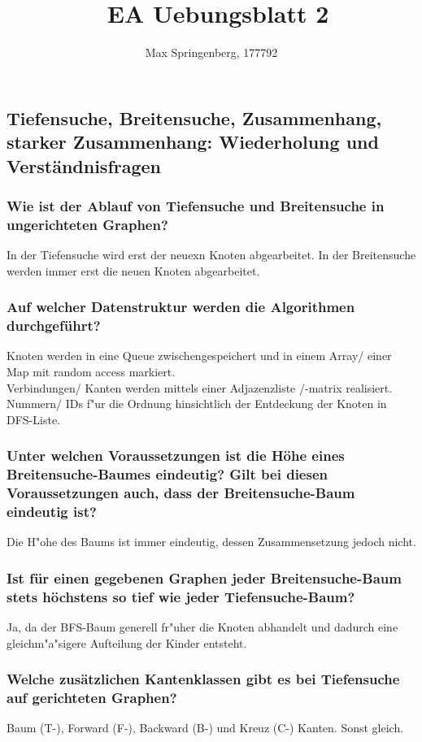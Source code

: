 \documentclass{article}
\author{Max Springenberg, 177792}
\title{\
    EA Uebungsblatt 2
    }
\date{}
\begin{document}
\maketitle
\newpage
\subsection{
    Tiefensuche, Breitensuche, Zusammenhang, starker Zusammenhang: Wiederholung 
        und Verständnisfragen
    }
\subsubsection{
    Wie ist der Ablauf von Tiefensuche und Breitensuche in ungerichteten 
        Graphen?
    }
In der Tiefensuche wird erst der neuexn Knoten abgearbeitet. In der Breitensuche
    werden immer erst die neuen Knoten abgearbeitet.\\
\subsubsection{
    Auf welcher Datenstruktur werden die Algorithmen durchgeführt?
    }
Knoten werden in eine Queue zwischengespeichert und in einem Array/ einer Map
    mit random access markiert.\\
Verbindungen/ Kanten werden mittels einer Adjazenzliste /-matrix realisiert.\\
Nummern/ IDs f"ur die Ordnung hinsichtlich der Entdeckung der Knoten in 
    DFS-Liste.\\
\subsubsection{
    Unter welchen Voraussetzungen ist die Höhe eines Breitensuche-Baumes 
        eindeutig? Gilt bei diesen Voraussetzungen auch, dass der 
        Breitensuche-Baum eindeutig ist?
    }
Die H"ohe des Baums ist immer eindeutig, dessen Zusammensetzung jedoch nicht.\\
\subsubsection{
    Ist für einen gegebenen Graphen jeder Breitensuche-Baum stets höchstens so 
        tief wie jeder Tiefensuche-Baum?
    }
Ja, da der BFS-Baum generell fr"uher die Knoten abhandelt und dadurch eine 
    gleichm"a"sigere Aufteilung der Kinder entsteht.\\
\subsubsection{
    Welche zusätzlichen Kantenklassen gibt es bei Tiefensuche auf gerichteten 
        Graphen?
    }
Baum (T-), Forward (F-), Backward (B-) und Kreuz (C-) Kanten. Sonst gleich.\\
\end{document}
